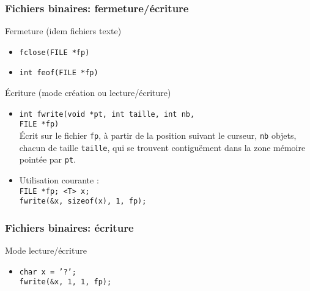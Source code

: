 \documentclass[table,handout,tikz,12pt,svgnames]{beamer}
\begin{document}
\begin{frame}[fragile=singleslide]
	\frametitle{Fichiers binaires: fermeture/écriture}
	\begin{block}{Fermeture \footnotesize(idem fichiers texte)}
		\begin{itemize}
			\item \texttt{fclose(FILE *fp)}
			\item \texttt{int feof(FILE *fp)}
		\end{itemize}
	\end{block}
	\begin{block}{Écriture (mode création ou lecture/écriture)}
		\begin{itemize}
			\item \texttt{int fwrite(void *pt, int taille, int nb,}\\
			\hspace{6em} \texttt{FILE *fp)}\\
			Écrit sur le fichier \texttt{fp}, à partir de la position suivant le curseur, \texttt{nb} objets, chacun de taille \texttt{taille}, qui se trouvent contiguëment dans la zone mémoire pointée par \texttt{pt}.
			\item Utilisation courante :\\
			\texttt{FILE *fp; <T> x; \\fwrite(\&x, sizeof(x), 1, fp);}
		\end{itemize}
	\end{block}
\end{frame}


\begin{frame}[fragile=singleslide]
	\frametitle{Fichiers binaires: écriture}
	\begin{block}{Mode lecture/écriture}
		\begin{itemize}
			\vspace{2cm}
			\item \texttt{char x = '?';}\\
			\texttt{fwrite(\&x, 1, 1, fp);}
			\vspace{3cm}			
		\end{itemize}
	\end{block}
\end{frame}
\end{document}
